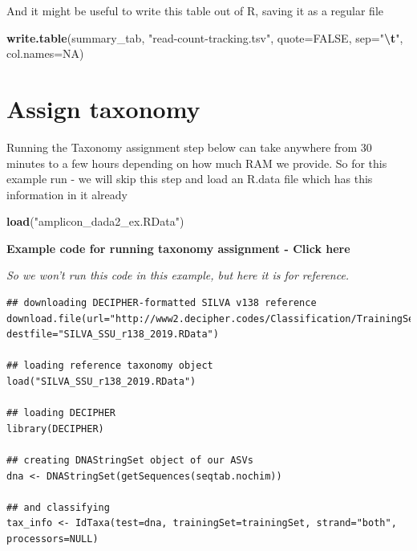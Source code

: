 \documentclass[
]{book}
\makeatletter
\newenvironment{Shaded}{\begin{snugshade}}{\end{snugshade}}
\newcommand{\AttributeTok}[1]{\textcolor[rgb]{0.13,0.29,0.53}{#1}}
\newcommand{\ConstantTok}[1]{\textcolor[rgb]{0.56,0.35,0.01}{#1}}
\newcommand{\FunctionTok}[1]{\textcolor[rgb]{0.13,0.29,0.53}{\textbf{#1}}}
\newcommand{\NormalTok}[1]{#1}
\newcommand{\SpecialCharTok}[1]{\textcolor[rgb]{0.81,0.36,0.00}{\textbf{#1}}}
\newcommand{\StringTok}[1]{\textcolor[rgb]{0.31,0.60,0.02}{#1}}
\newenvironment{kframe}{%
\medskip{}
\setlength{\fboxsep}{.8em}
 \def\at@end@of@kframe{}%
 \ifinner\ifhmode%
  \def\at@end@of@kframe{\end{minipage}}%
  \begin{minipage}{\columnwidth}%
 \fi\fi%
 \def\FrameCommand##1{\hskip\@totalleftmargin \hskip-\fboxsep
 \colorbox{shadecolor}{##1}\hskip-\fboxsep
     \hskip-\linewidth \hskip-\@totalleftmargin \hskip\columnwidth}%
 \MakeFramed {\advance\hsize-\width
   \@totalleftmargin\z@ \linewidth\hsize
   \@setminipage}}%
 {\par\unskip\endMakeFramed%
 \at@end@of@kframe}
\newenvironment{block}[1]
  {
  \begin{itemize}
  \renewcommand{\labelitemi}{
    \raisebox{-.7\height}[0pt][0pt]{
      {\setkeys{Gin}{width=3em,keepaspectratio}\texttt{[image: images/\#1]}}
    }
  }
  \setlength{\fboxsep}{1em}
  \begin{kframe}
  \item
  }
  {
  \end{kframe}
  \end{itemize}
  }
\newenvironment{rmdwarning}
  {\begin{block}{warning}}
  {\end{block}}
\makeatother
\begin{document}
And it might be useful to write this table out of R, saving it as a regular file

\begin{Shaded}
\begin{Highlighting}[]
\FunctionTok{write.table}\NormalTok{(summary\_tab, }\StringTok{"read{-}count{-}tracking.tsv"}\NormalTok{, }\AttributeTok{quote=}\ConstantTok{FALSE}\NormalTok{, }\AttributeTok{sep=}\StringTok{"}\SpecialCharTok{\textbackslash{}t}\StringTok{"}\NormalTok{, }\AttributeTok{col.names=}\ConstantTok{NA}\NormalTok{)}
\end{Highlighting}
\end{Shaded}

\hypertarget{assign-taxonomy}{%
\section{Assign taxonomy}\label{assign-taxonomy}}

\begin{rmdwarning}
Running the Taxonomy assignment step below can take anywhere from 30
minutes to a few hours depending on how much RAM we provide. So for this
example run - we will skip this step and load an R.data file which has
this information in it already
\end{rmdwarning}

\begin{Shaded}
\begin{Highlighting}[]
\FunctionTok{load}\NormalTok{(}\StringTok{"amplicon\_dada2\_ex.RData"}\NormalTok{)}
\end{Highlighting}
\end{Shaded}

\textbf{Example code for running taxonomy assignment - Click here}

\emph{So we won't run this code in this example, but here it is for reference.}

\begin{verbatim}
## downloading DECIPHER-formatted SILVA v138 reference
download.file(url="http://www2.decipher.codes/Classification/TrainingSets/SILVA_SSU_r138_2019.RData", destfile="SILVA_SSU_r138_2019.RData")

## loading reference taxonomy object
load("SILVA_SSU_r138_2019.RData")

## loading DECIPHER
library(DECIPHER)

## creating DNAStringSet object of our ASVs
dna <- DNAStringSet(getSequences(seqtab.nochim))

## and classifying
tax_info <- IdTaxa(test=dna, trainingSet=trainingSet, strand="both", processors=NULL)
\end{verbatim}
\end{document}
